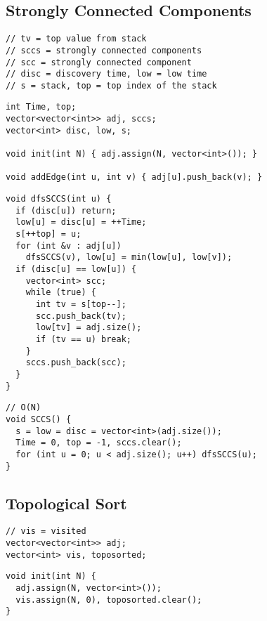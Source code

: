 \documentclass[twoside]{article}
\newcommand{\fileTitleStyle}{\large\underline}
\begin{document}
\begin{multicols*}{2}
\subsection*{Strongly Connected Components}
\begin{verbatim}
// tv = top value from stack
// sccs = strongly connected components
// scc = strongly connected component
// disc = discovery time, low = low time
// s = stack, top = top index of the stack
\end{verbatim}
\vspace{-12pt}
\begin{verbatim}
int Time, top;
vector<vector<int>> adj, sccs;
vector<int> disc, low, s;

void init(int N) { adj.assign(N, vector<int>()); }

void addEdge(int u, int v) { adj[u].push_back(v); }
\end{verbatim}
\vspace{-12pt}
\begin{verbatim}
void dfsSCCS(int u) {
  if (disc[u]) return;
  low[u] = disc[u] = ++Time;
  s[++top] = u;
  for (int &v : adj[u])
    dfsSCCS(v), low[u] = min(low[u], low[v]);
  if (disc[u] == low[u]) {
    vector<int> scc;
    while (true) {
      int tv = s[top--];
      scc.push_back(tv);
      low[tv] = adj.size();
      if (tv == u) break;
    }
    sccs.push_back(scc);
  }
}
\end{verbatim}
\vspace{-12pt}
\begin{verbatim}
// O(N)
void SCCS() {
  s = low = disc = vector<int>(adj.size());
  Time = 0, top = -1, sccs.clear();
  for (int u = 0; u < adj.size(); u++) dfsSCCS(u);
}
\end{verbatim}

\subsectionfont{\centering\bfseries\LARGE}
\subsectionfont{\fileTitleStyle}
\subsection*{Topological Sort}
\begin{verbatim}
// vis = visited
vector<vector<int>> adj;
vector<int> vis, toposorted;
\end{verbatim}
\vspace{-12pt}
\begin{verbatim}
void init(int N) {
  adj.assign(N, vector<int>());
  vis.assign(N, 0), toposorted.clear();
}


\end{verbatim}
\end{multicols*}
\end{document}
